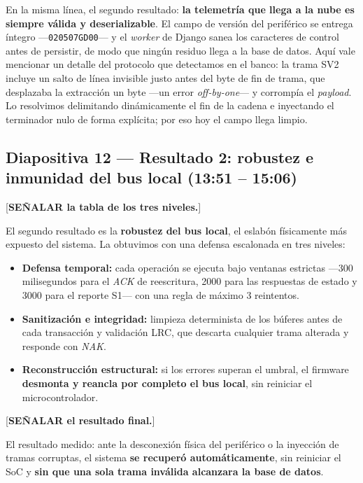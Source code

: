 \documentclass[11pt, a4paper]{article}
\begin{document}
En la misma línea, el segundo resultado: \textbf{la telemetría que llega a la nube es siempre válida y deserializable}. El campo de versión del periférico se entrega íntegro —\texttt{020507GD00}— y el \textit{worker} de Django sanea los caracteres de control antes de persistir, de modo que ningún residuo llega a la base de datos. Aquí vale mencionar un detalle del protocolo que detectamos en el banco: la trama SV2 incluye un salto de línea invisible justo antes del byte de fin de trama, que desplazaba la extracción un byte —un error \textit{off-by-one}— y corrompía el \textit{payload}. Lo resolvimos delimitando dinámicamente el fin de la cadena e inyectando el terminador nulo de forma explícita; por eso hoy el campo llega limpio.

\subsection*{Diapositiva 12 — Resultado 2: robustez e inmunidad del bus local (13:51 – 15:06)}

[\textbf{SEÑALAR la tabla de los tres niveles.}]

El segundo resultado es la \textbf{robustez del bus local}, el eslabón físicamente más expuesto del sistema. La obtuvimos con una defensa escalonada en tres niveles:

\begin{itemize}[label=-]
    \item \textbf{Defensa temporal:} cada operación se ejecuta bajo ventanas estrictas —300 milisegundos para el \textit{ACK} de reescritura, 2000 para las respuestas de estado y 3000 para el reporte S1— con una regla de máximo 3 reintentos.
    \item \textbf{Sanitización e integridad:} limpieza determinista de los búferes antes de cada transacción y validación LRC, que descarta cualquier trama alterada y responde con \textit{NAK}.
    \item \textbf{Reconstrucción estructural:} si los errores superan el umbral, el firmware \textbf{desmonta y reancla por completo el bus local}, sin reiniciar el microcontrolador.
\end{itemize}

[\textbf{SEÑALAR el resultado final.}]

El resultado medido: ante la desconexión física del periférico o la inyección de tramas corruptas, el sistema \textbf{se recuperó automáticamente}, sin reiniciar el SoC y \textbf{sin que una sola trama inválida alcanzara la base de datos}.
\end{document}
